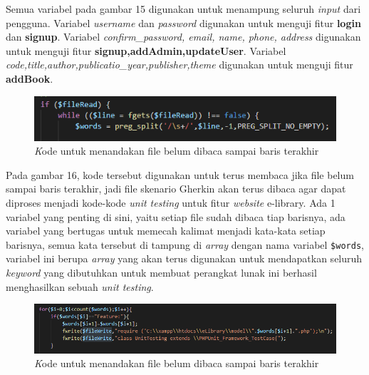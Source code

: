 \documentclass[a4paper,twoside]{article}
\begin{document}
\begin{enumerate}
Semua variabel pada gambar 15 digunakan untuk menampung seluruh \textit{input} dari pengguna. Variabel \textit{username} dan \textit{password} digunakan untuk menguji fitur \textbf{login} dan \textbf{signup}. Variabel \textit{confirm\_password, email, name, phone, address} digunakan untuk menguji fitur \textbf{signup,addAdmin,updateUser}. Variabel \textit{code,title,author,publicatio\_year,publisher,theme} digunakan untuk menguji fitur \textbf{addBook}. 

\begin{figure}[h!]
			\includegraphics[scale=1.00]{../DokumenSkripsi/gambar/implementasi5}
			\centering
			\caption{\textit Kode untuk menandakan file belum dibaca sampai baris terakhir}
		\end{figure}

Pada gambar 16, kode tersebut digunakan untuk terus membaca jika file belum sampai baris terakhir, jadi file skenario Gherkin akan terus dibaca agar dapat diproses menjadi kode-kode \textit{unit testing} untuk fitur \textit{website} e-library. Ada 1 variabel yang penting di sini, yaitu setiap file sudah dibaca tiap barisnya, ada variabel yang bertugas untuk memecah kalimat menjadi kata-kata setiap barisnya, semua kata tersebut di tampung di \textit{array} dengan nama variabel \texttt{\$words}, variabel ini berupa \textit{array} yang akan terus digunakan untuk mendapatkan seluruh \textit{keyword} yang dibutuhkan untuk membuat perangkat lunak ini berhasil menghasilkan sebuah \textit{unit testing}. 

\begin{figure}[h!]
			\includegraphics[scale=1.00]{../DokumenSkripsi/gambar/implementasi6}
			\centering
			\caption{\textit Kode untuk menandakan file belum dibaca sampai baris terakhir}
		\end{figure}


\end{enumerate}
\end{document}
